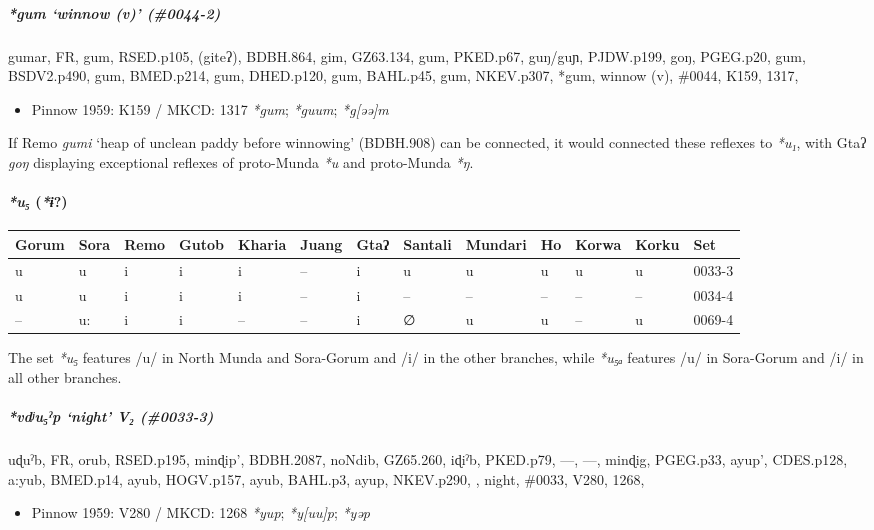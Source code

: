 \documentclass[a4paper,]{article}
\providecommand{\tightlist}{%
  \setlength{\itemsep}{0pt}\setlength{\parskip}{0pt}}
\let\oldparagraph\paragraph
\renewcommand{\paragraph}[1]{\oldparagraph{#1}\mbox{}}
\let\oldsubparagraph\subparagraph
\renewcommand{\subparagraph}[1]{\oldsubparagraph{#1}\mbox{}}
\begin{document}
\subparagraph{\texorpdfstring{\emph{*gum} `winnow (v)'
(\#0044-2)}{*gum winnow (v) (\#0044-2)}}\label{gum-winnow-v-0044-2}

gumar, FR, gum, RSED.p105, (giteʔ), BDBH.864, gim, GZ63.134, gum,
PKED.p67, guŋ/guɲ, PJDW.p199, goŋ, PGEG.p20, gum, BSDV2.p490, gum,
BMED.p214, gum, DHED.p120, gum, BAHL.p45, gum, NKEV.p307, *gum, winnow
(v), \#0044, K159, 1317,

\begin{itemize}
\tightlist
\item
  Pinnow 1959: K159 / MKCD: 1317 \emph{*gum}; \emph{*guum};
  \emph{*g{[}əə{]}m}
\end{itemize}

If Remo \emph{gumi} `heap of unclean paddy before winnowing' (BDBH.908)
can be connected, it would connected these reflexes to \emph{*u₁}, with
Gtaʔ \emph{goŋ} displaying exceptional reflexes of proto-Munda \emph{*u}
and proto-Munda \emph{*ŋ}.

\paragraph{\texorpdfstring{\emph{*u₅}
(\emph{*ɨ}?)}{*u₅ (*ɨ?)}}\label{u-ux268}

\begin{longtable}[]{@{}lllllllllllll@{}}
\toprule
Gorum & Sora & Remo & Gutob & Kharia & Juang & Gtaʔ & Santali & Mundari
& Ho & Korwa & Korku & Set\tabularnewline
\midrule
\endhead
u & u & i & i & i & -- & i & u & u & u & u & u & 0033-3\tabularnewline
u & u & i & i & i & -- & i & -- & -- & -- & -- & -- &
0034-4\tabularnewline
-- & u: & i & i & -- & -- & i & ∅ & u & u & -- & u &
0069-4\tabularnewline
\bottomrule
\end{longtable}

The set \emph{*u₅} features /u/ in North Munda and Sora-Gorum and /i/ in
the other branches, while \emph{*u₅ₐ} features /u/ in Sora-Gorum and /i/
in all other branches.

\subparagraph{\texorpdfstring{\emph{*vdʲu₅ˀp} `night' V₂
(\#0033-3)}{*vdʲu₅ˀp night V₂ (\#0033-3)}}\label{vdux2b2uux2c0p-night-v-0033-3}

uɖuˀb, FR, orub, RSED.p195, minɖip', BDBH.2087, noNdib, GZ65.260, iɖiˀb,
PKED.p79, ---, ---, minɖig, PGEG.p33, ayup', CDES.p128, a:yub, BMED.p14,
ayub, HOGV.p157, ayub, BAHL.p3, ayup, NKEV.p290, , night, \#0033, V280,
1268,

\begin{itemize}
\tightlist
\item
  Pinnow 1959: V280 / MKCD: 1268 \emph{*yup}; \emph{*y{[}uu{]}p};
  \emph{*yəp}
\end{itemize}
\end{document}
